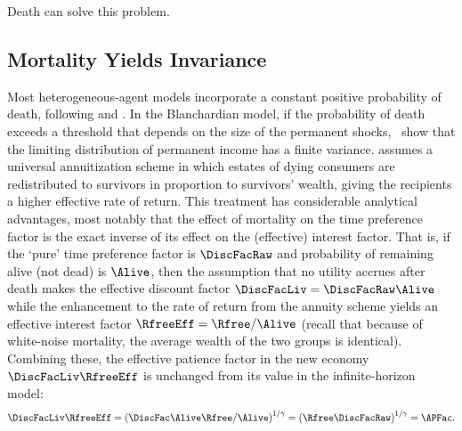 \documentclass[BufferStockTheory]{subfiles}
\begin{document}

Death can solve this problem.


\hypertarget{Mortality}{}
\subsection{Mortality Yields Invariance}\label{sec:Mortality}

\hypertarget{Blanchard-Lives}{}
Most heterogeneous-agent models incorporate a constant positive probability of death, following \cite{blanchardFinite} and \cite{yaari1965uncertain}.
In the Blanchardian model, if the probability of death exceeds a threshold that depends on the size of the permanent shocks,~\cite{cstwMPC} show that the limiting distribution of permanent income has a finite variance.
\cite{blanchardFinite} assumes a universal annuitization scheme in which estates of dying consumers are redistributed to survivors in proportion to survivors' wealth, giving the recipients a higher effective rate of return.
This treatment has considerable analytical advantages, most notably that the effect of mortality on the time preference factor is the exact inverse of its effect on the (effective) interest factor.
That is, if the `pure' time preference factor is $\DiscFacRaw$ and probability of remaining alive (not dead) is $\Alive$, then the assumption that no utility accrues after death makes the effective discount factor $\DiscFacLiv=\DiscFacRaw\Alive$  while the enhancement to the rate of return from the annuity scheme yields an effective interest factor $\RfreeEff=\Rfree/\Alive$ (recall that because of white-noise mortality, the average wealth of the two groups is identical).
Combining these, the effective patience factor in the new economy $\DiscFacLiv \RfreeEff$ is unchanged from its value in the infinite-horizon model:%
\begin{equation}
  \DiscFacLiv \RfreeEff = {\left(\DiscFac \Alive \Rfree / \Alive\right)}^{1/\CRRA} = {\left(\Rfree \DiscFacRaw\right)}^{1/\CRRA} = \APFac.
\end{equation}
\end{document}
